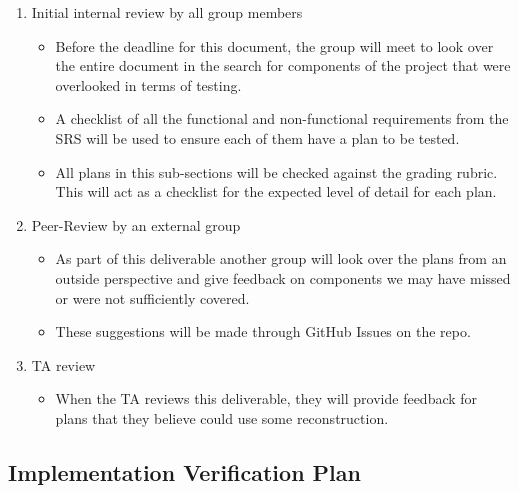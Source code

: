 \documentclass[12pt, titlepage]{article}
\begin{document}
\begin{enumerate}
    \item Initial internal review by all group members
    \begin{itemize}
        \item Before the deadline for this document, the group will meet to look over the entire document in the search for components of the project that were overlooked in terms of testing.
        \item A checklist of all the functional and non-functional requirements from the SRS will be used to ensure each of them have a plan to be tested.
        \item All plans in this sub-sections will be checked against the grading rubric. This will act as a checklist for the expected level of detail for each plan.
    \end{itemize}
    \item Peer-Review by an external group
    \begin{itemize}
        \item As part of this deliverable another group will look over the plans from an outside perspective and give feedback on components we may have missed or were not sufficiently covered.
        \item These suggestions will be made through GitHub Issues on the repo.
    \end{itemize}
    \item TA review
    \begin{itemize}
        \item When the TA reviews this deliverable, they will provide feedback for plans that they believe could use some reconstruction.
    \end{itemize}
\end{enumerate}



\subsection{Implementation Verification Plan}



\end{document}
